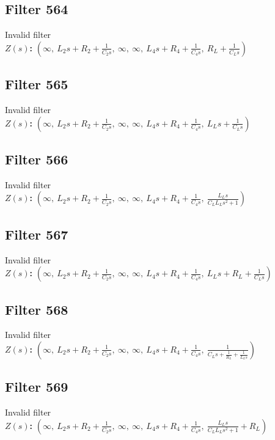 \documentclass{article}
\begin{document}
\subsection*{Filter 564}
Invalid filter \\ 
\textbf{$Z(s)$:} $\left( \infty, \  L_{2} s + R_{2} + \frac{1}{C_{2} s}, \  \infty, \  \infty, \  L_{4} s + R_{4} + \frac{1}{C_{4} s}, \  R_{L} + \frac{1}{C_{L} s}\right)$ \\ 
\subsection*{Filter 565}
Invalid filter \\ 
\textbf{$Z(s)$:} $\left( \infty, \  L_{2} s + R_{2} + \frac{1}{C_{2} s}, \  \infty, \  \infty, \  L_{4} s + R_{4} + \frac{1}{C_{4} s}, \  L_{L} s + \frac{1}{C_{L} s}\right)$ \\ 
\subsection*{Filter 566}
Invalid filter \\ 
\textbf{$Z(s)$:} $\left( \infty, \  L_{2} s + R_{2} + \frac{1}{C_{2} s}, \  \infty, \  \infty, \  L_{4} s + R_{4} + \frac{1}{C_{4} s}, \  \frac{L_{L} s}{C_{L} L_{L} s^{2} + 1}\right)$ \\ 
\subsection*{Filter 567}
Invalid filter \\ 
\textbf{$Z(s)$:} $\left( \infty, \  L_{2} s + R_{2} + \frac{1}{C_{2} s}, \  \infty, \  \infty, \  L_{4} s + R_{4} + \frac{1}{C_{4} s}, \  L_{L} s + R_{L} + \frac{1}{C_{L} s}\right)$ \\ 
\subsection*{Filter 568}
Invalid filter \\ 
\textbf{$Z(s)$:} $\left( \infty, \  L_{2} s + R_{2} + \frac{1}{C_{2} s}, \  \infty, \  \infty, \  L_{4} s + R_{4} + \frac{1}{C_{4} s}, \  \frac{1}{C_{L} s + \frac{1}{R_{L}} + \frac{1}{L_{L} s}}\right)$ \\ 
\subsection*{Filter 569}
Invalid filter \\ 
\textbf{$Z(s)$:} $\left( \infty, \  L_{2} s + R_{2} + \frac{1}{C_{2} s}, \  \infty, \  \infty, \  L_{4} s + R_{4} + \frac{1}{C_{4} s}, \  \frac{L_{L} s}{C_{L} L_{L} s^{2} + 1} + R_{L}\right)$ \\ 
\end{document}
